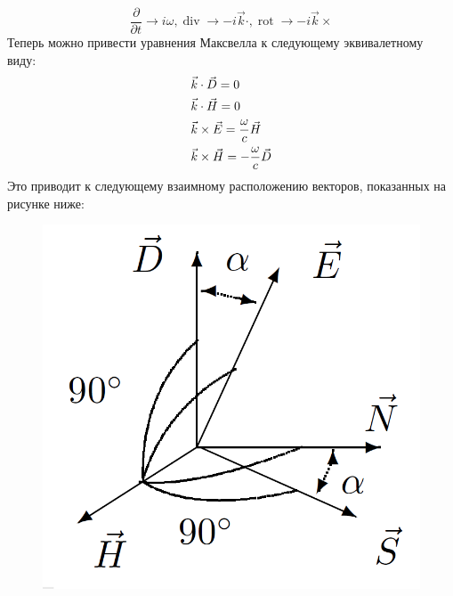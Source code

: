 \documentclass[a4paper,12pt]{article}
\begin{document}
$$\frac{\partial }{{\partial t}} \to i\omega, \operatorname{div} \to -i\vec k\cdot,\operatorname{rot} \to -i\vec k\times  $$
\newpage
Теперь можно привести уравнения Максвелла к следующему эквивалетному виду:
\[\begin{gathered}
\vec k \cdot \vec D = 0 \hfill \\
\vec k \cdot \vec H = 0 \hfill \\
\vec k \times \vec E = \frac{\omega }{c}\vec H \hfill \\
\vec k \times \vec H =  - \frac{\omega }{c}\vec D \hfill \\ 
\end{gathered} \]
Это приводит к следующему взаимному расположению векторов, показанных на рисунке ниже:
\begin{figure}[h!]
	\begin{center}
		\includegraphics[scale = 0.4]{1.png}
	\end{center}
\end{figure}
\end{document}
